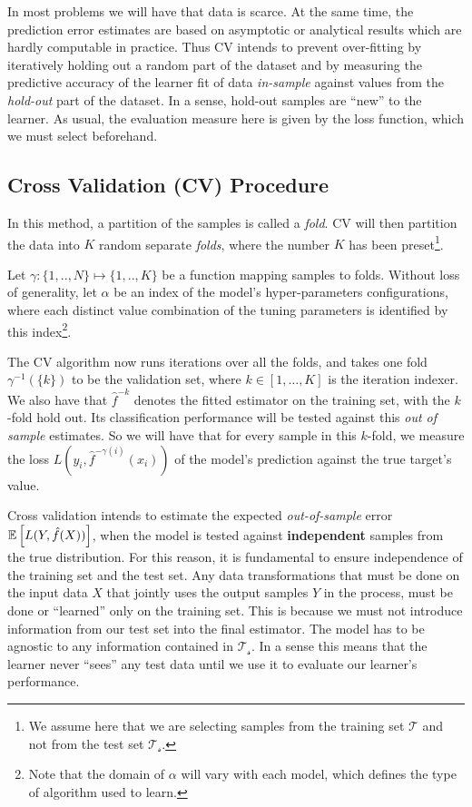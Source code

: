In most problems we will have that data is scarce.
At the same time, the prediction error estimates are based on asymptotic or analytical results which are hardly computable in practice.
Thus CV intends to prevent over-fitting by iteratively holding out a random part of the dataset and by measuring the predictive accuracy of the learner fit of data \textit{in-sample} against values from the \textit{hold-out} part of the dataset.
In a sense, hold-out samples are ``new'' to the learner.
As usual, the evaluation measure here is given by the loss function, which we must select beforehand.

\subsection{Cross Validation (CV) Procedure}\label{subsection:crossValidationProcedure}

In this method, a partition of the samples is called a \textit{fold}.
CV will then partition the data into $K$ random separate \textit{folds}, where the number $K$ has been preset\footnote{ We assume here that we are selecting samples from the training set $\mathcal{T}$ and not from the test set $\mathcal{T_s}$.}.

Let $\gamma : \{1,..,N\} \mapsto \{1, .., K\}$ be a function mapping samples to folds.
Without loss of generality, let $\alpha$ be an index of the model's hyper-parameters configurations, where each distinct value combination of the tuning parameters is identified by this index\footnote{ Note that the domain of $\alpha$ will vary with each model, which defines the type of algorithm used to learn.}.

The CV algorithm now runs iterations over all the folds, and takes one fold $\gamma^{-1}(\{k\})$ to be the validation set, where $k \in [1,\ldots,K]$ is the iteration indexer.
We also have that $\hat{f}^{-k}$ denotes the fitted estimator on the training set, with the $k$-fold hold out.
Its classification performance will be tested against this \textit{out of sample} estimates.
So we will have that for every sample in this $k$-fold, we measure the loss $L(y_i, \hat{f}^{-\gamma(i)}(x_i))$ of the model's prediction against the true target's value.

Cross validation intends to estimate the expected \textit{out-of-sample} error $\operatorname{\mathbb{E}} \left[ L(Y, \hat{f}(X)) \right]$, when the model is tested against \textbf{independent} samples from the true distribution.
For this reason, it is fundamental to ensure independence of the training set and the test set.
Any data transformations that must be done on the input data $X$ that jointly uses the output samples $Y$ in the process, must be done or ``learned'' only on the training set.
This is because we must not introduce information from our test set into the final estimator.
The model has to be agnostic to any information contained in $\mathcal{T_s}$.
In a sense this means that the learner never ``sees'' any test data until we use it to evaluate our learner's performance.

